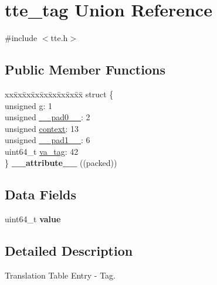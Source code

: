 \hypertarget{uniontte__tag}{}\section{tte\+\_\+tag Union Reference}
\label{uniontte__tag}


{\ttfamily \#include $<$tte.\+h$>$}

\subsection*{Public Member Functions}
\begin{DoxyCompactItemize}
\item 
\mbox{\label{uniontte__tag_a5c40df03d0576289bf77968a2e8d412c}} 
\begin{tabbing}
xx\=xx\=xx\=xx\=xx\=xx\=xx\=xx\=xx\=\kill
struct \{\\
\>unsigned \mbox{\hyperlink{uniontte__tag_a59807e347c45e491f17610936ed56a0e}{g}}: 1\\
\>unsigned \mbox{\hyperlink{uniontte__tag_aee13aa963a6f199e62cac0e1ca0c7c13}{\_\_pad0\_\_}}: 2\\
\>unsigned \mbox{\hyperlink{uniontte__tag_a34594afc45da74386d5f3a62f9b7b74d}{context}}: 13\\
\>unsigned \mbox{\hyperlink{uniontte__tag_a4509c462936a4ab721fce11ce6b91db0}{\_\_pad1\_\_}}: 6\\
\>uint64\_t \mbox{\hyperlink{uniontte__tag_a9c17eef4040ab382b9ce67bcb34683cb}{va\_tag}}: 42\\
\} {\bfseries \_\_attribute\_\_} ((packed))\\

\end{tabbing}\end{DoxyCompactItemize}
\subsection*{Data Fields}
\begin{DoxyCompactItemize}
\item 
\mbox{\label{uniontte__tag_ab58254f68f6b2a41da74fda2c457e09b}} 
uint64\+\_\+t {\bfseries value}
\end{DoxyCompactItemize}


\subsection{Detailed Description}
Translation Table Entry -\/ Tag. 

